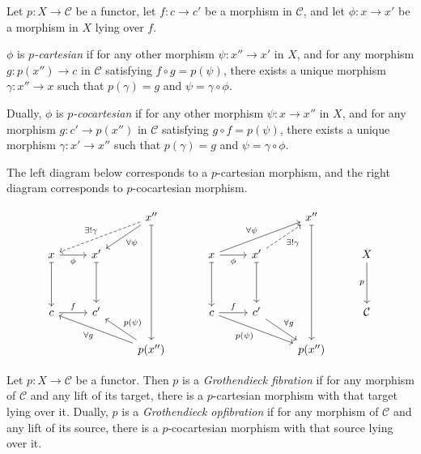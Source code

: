 \documentclass{MetricNotes2023}
\begin{document}
\begin{definition}
Let \(p : X \to \mathcal{C}\) be a functor, let \(f : c \to c'\) be a morphism in \(\mathcal{C}\), and let \(\phi : x \to x'\) be a morphism in \(X\) lying over \(f\).

\(\phi\) is \textit{\(p\)-cartesian} if for any other morphism \(\psi : x'' \to x'\) in \(X\), and for any morphism \(g : p(x'')\to c\) in \(\mathcal{C}\) satisfying \(f \circ g = p(\psi)\), there exists a unique morphism \(\gamma : x'' \to x\) such that \(p(\gamma)=g\) and \(\psi = \gamma \circ \phi\).

Dually, \(\phi\) is \textit{\(p\)-cocartesian} if for any other morphism \(\psi : x \to x''\) in \(X\), and for any morphism \(g : c' \to p(x'')\) in \(\mathcal{C}\) satisfying \(g \circ f = p(\psi)\), there exists a unique morphism \(\gamma : x' \to x''\) such that \(p(\gamma)=g\) and \(\psi = \gamma \circ \phi\).  

The left diagram below corresponds to a \(p\)-cartesian morphism, and the right diagram corresponds to \(p\)-cocartesian morphism.

\[\begin{tikzcd}
 & & x'' \arrow[dddd, mapsto, ""] \arrow[dll, dashrightarrow, swap, "\exists ! \gamma"] \arrow[dl, "\forall \psi"] \\
x \arrow[r, swap, "\phi"] \arrow[dd, mapsto, swap, ""] & x' \arrow[dd, mapsto, swap, ""]  & \\
& & \\
c \arrow[r, "f"] & c'  & \\
 & & p(x'') \arrow[llu, "\forall g"] \arrow[lu, swap, "p(\psi)"] 
\end{tikzcd}\qquad\quad \begin{tikzcd}
 & & x'' \arrow[dddd, mapsto, ""] & \\
x \arrow[r, swap, "\phi"] \arrow[dd, mapsto, swap, ""] \arrow[urr, "\forall \psi"] & x' \arrow[dd, mapsto, swap, ""] \arrow[ur, dashrightarrow, swap, "\exists! \gamma"] & & X \arrow[dd, swap, "p"] \\
& & & \\
c \arrow[r, "f"] \arrow[rrd, swap, "p(\psi)"] & c' \arrow[rd, "\forall g"]  & & \mathcal{C}\\
 & & p(x'') & 
\end{tikzcd}\]

\end{definition}

\begin{definition}\label{opfibration}
Let \(p : X \to \mathcal{C}\) be a functor. Then \(p\) is a \textit{Grothendieck fibration} if for any morphism of \(\mathcal{C}\) and any lift of its target, there is a \(p\)-cartesian morphism with that target lying over it. Dually, \(p\) is a \textit{Grothendieck opfibration} if for any morphism of \(\mathcal{C}\) and any lift of its source, there  is a \(p\)-cocartesian morphism with that source lying over it.
\end{definition}
\end{document}
